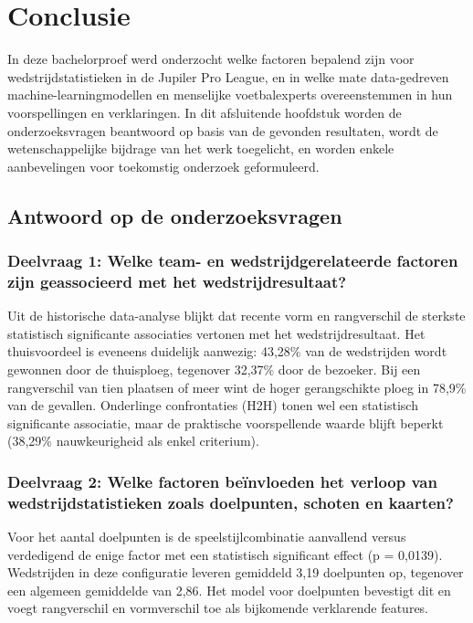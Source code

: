 
\chapter{Conclusie}%
\label{ch:conclusie}

In deze bachelorproef werd onderzocht welke factoren bepalend zijn voor wedstrijdstatistieken in de Jupiler Pro League,
en in welke mate data-gedreven machine-learningmodellen en menselijke voetbalexperts overeenstemmen in hun voorspellingen en verklaringen.
In dit afsluitende hoofdstuk worden de onderzoeksvragen beantwoord op basis van de gevonden resultaten,
wordt de wetenschappelijke bijdrage van het werk toegelicht, en worden enkele aanbevelingen voor toekomstig onderzoek geformuleerd.

\section{Antwoord op de onderzoeksvragen}

\subsection*{Deelvraag 1: Welke team- en wedstrijdgerelateerde factoren zijn geassocieerd met het wedstrijdresultaat?}

Uit de historische data-analyse blijkt dat recente vorm en rangverschil de sterkste statistisch significante
associaties vertonen met het wedstrijdresultaat. Het thuisvoordeel is eveneens duidelijk aanwezig: 43,28\% van
de wedstrijden wordt gewonnen door de thuisploeg, tegenover 32,37\% door de bezoeker. Bij een rangverschil
van tien plaatsen of meer wint de hoger gerangschikte ploeg in 78,9\% van de gevallen. Onderlinge confrontaties (H2H)
tonen wel een statistisch significante associatie, maar de praktische voorspellende waarde blijft beperkt (38,29\% nauwkeurigheid als enkel criterium).

\subsection*{Deelvraag 2: Welke factoren beïnvloeden het verloop van wedstrijdstatistieken zoals doelpunten, schoten en kaarten?}

Voor het aantal doelpunten is de speelstijlcombinatie aanvallend versus verdedigend de enige factor
met een statistisch significant effect (p = 0,0139). Wedstrijden in deze configuratie leveren gemiddeld 3,19 doelpunten op,
tegenover een algemeen gemiddelde van 2,86. Het model voor doelpunten bevestigt dit en voegt rangverschil
en vormverschil toe als bijkomende verklarende features.

